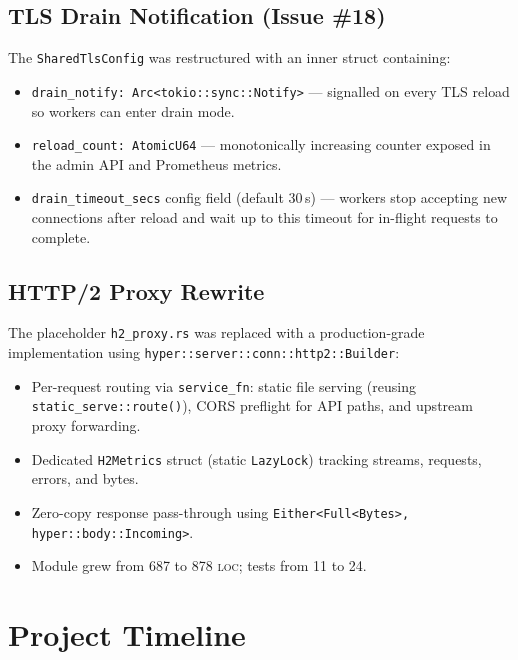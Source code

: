 \documentclass[a4paper, 11pt]{article}
\newcommand{\loc}{\textsc{loc}}
\begin{document}
\subsection{TLS Drain Notification (Issue \#18)}

The \texttt{SharedTlsConfig} was restructured with an inner struct
containing:

\begin{itemize}[nosep]
  \item \texttt{drain\_notify: Arc<tokio::sync::Notify>} --- signalled on
        every TLS reload so workers can enter drain mode.
  \item \texttt{reload\_count: AtomicU64} --- monotonically increasing
        counter exposed in the admin API and Prometheus metrics.
  \item \texttt{drain\_timeout\_secs} config field (default 30\,s) ---
        workers stop accepting new connections after reload and wait up to
        this timeout for in-flight requests to complete.
\end{itemize}

\subsection{HTTP/2 Proxy Rewrite}

The placeholder \texttt{h2\_proxy.rs} was replaced with a production-grade
implementation using \texttt{hyper::server::conn::http2::Builder}:

\begin{itemize}[nosep]
  \item Per-request routing via \texttt{service\_fn}: static file serving
        (reusing \texttt{static\_serve::route()}), CORS preflight for API
        paths, and upstream proxy forwarding.
  \item Dedicated \texttt{H2Metrics} struct (static \texttt{LazyLock})
        tracking streams, requests, errors, and bytes.
  \item Zero-copy response pass-through using
        \texttt{Either<Full<Bytes>, hyper::body::Incoming>}.
  \item Module grew from 687 to 878 \loc{}; tests from 11 to 24.
\end{itemize}


\section{Project Timeline}
\end{document}
